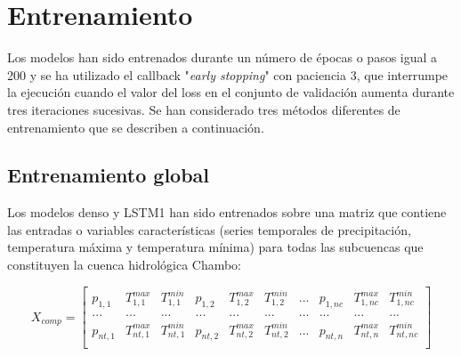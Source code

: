   \section{Entrenamiento}
  Los modelos han sido entrenados durante un número de épocas o pasos
  igual a 200 y se ha utilizado el callback "\textit{early stopping}" con paciencia 3, 
  que interrumpe la ejecución cuando el valor del loss en el conjunto de validación aumenta durante tres iteraciones sucesivas. 
Se han considerado tres métodos diferentes de entrenamiento que se describen a continuación.

 
  \subsection{Entrenamiento global}
 Los modelos denso y LSTM1 han sido entrenados sobre una matriz que contiene las entradas o variables características 
 (series temporales de precipitación, temperatura máxima y temperatura mínima) para 
todas las subcuencas que constituyen la cuenca hidrológica Chambo:
  
  \vspace{5mm}
  
    \begin{equation*}
      X_{comp}= 
      \begin{bmatrix}
          p_{1,1} & T^{max}_{1,1} &  T^{min}_{1,1}& p_{1,2} & T^{max}_{1,2} &  T^{min}_{1,2} & ... &p_{1,nc} & T^{max}_{1,nc} &  T^{min}_{1,nc} \\
          ... & ... &  ...& ... & ...&  ... & ... &... & ... &  ... \\
          p_{nt,1} & T^{max}_{nt,1} &  T^{min}_{nt,1}& p_{nt,2} & T^{max}_{nt,2} &  T^{min}_{nt,2} & ... &p_{nt,n} & T^{max}_{nt,n} &  T^{min}_{nt,nc} \\
          \end{bmatrix}
  \end{equation*}
  
